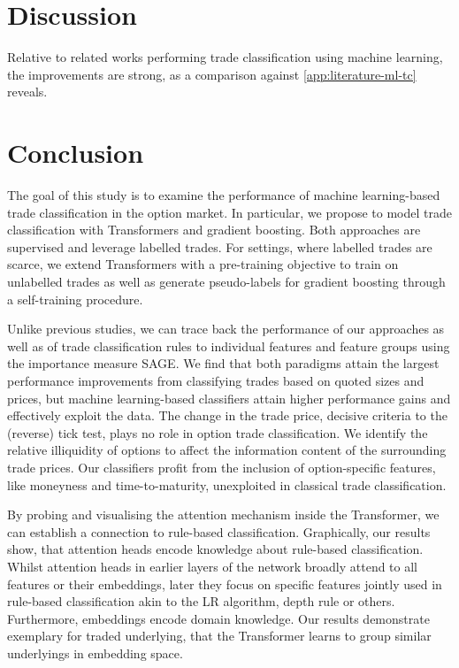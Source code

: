 \section{Discussion}\label{sec:discussion}

Relative to related works performing trade classification using machine learning, the improvements are strong, as a comparison against \cref{app:literature-ml-tc} reveals.

\newpage
\section{Conclusion}\label{sec:conclusion}

The goal of this study is to examine the performance of machine learning-based trade classification in the option market. In particular, we propose to model trade classification with Transformers and gradient boosting. Both approaches are supervised and leverage labelled trades. For settings, where labelled trades are scarce, we extend Transformers with a pre-training objective to train on unlabelled trades as well as generate pseudo-labels for gradient boosting through a self-training procedure.

Unlike previous studies, we can trace back the performance of our approaches as well as of trade classification rules to individual features and feature groups using the importance measure \gls{SAGE}. We find that both paradigms attain the largest performance improvements from classifying trades based on quoted sizes and prices, but machine learning-based classifiers attain higher performance gains and effectively exploit the data. The change in the trade price, decisive criteria to the (reverse) tick test, plays no role in option trade classification. We identify the relative illiquidity of options to affect the information content of the surrounding trade prices. Our classifiers profit from the inclusion of option-specific features, like moneyness and time-to-maturity, unexploited in classical trade classification. 

By probing and visualising the attention mechanism inside the Transformer, we can establish a connection to rule-based classification. Graphically, our results show, that attention heads encode knowledge about rule-based classification. Whilst attention heads in earlier layers of the network broadly attend to all features or their embeddings, later they focus on specific features jointly used in rule-based classification akin to the \gls{LR} algorithm, depth rule or others. Furthermore, embeddings encode domain knowledge. Our results demonstrate exemplary for traded underlying, that the Transformer learns to group similar underlyings in embedding space.

